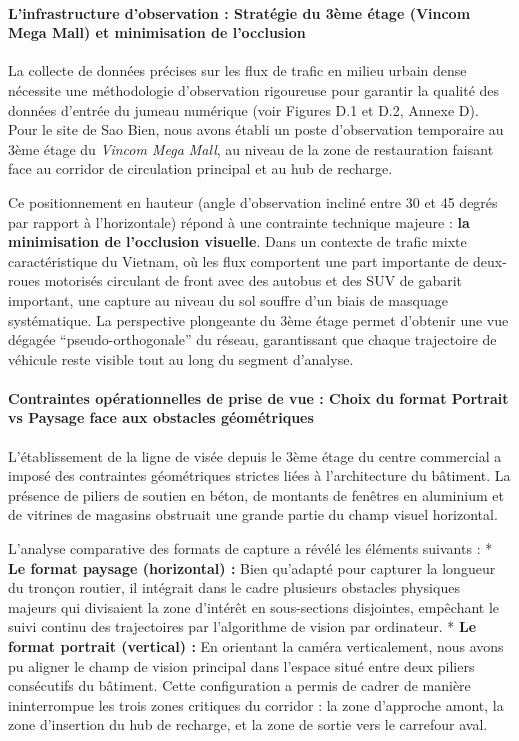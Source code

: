 \documentclass[10pt, a4paper]{article}
\begin{document}
\paragraph{L'infrastructure d'observation : Stratégie du 3ème étage
(Vincom Mega Mall) et minimisation de
l'occlusion}\label{linfrastructure-dobservation-stratuxe9gie-du-3uxe8me-uxe9tage-vincom-mega-mall-et-minimisation-de-locclusion}

La collecte de données précises sur les flux de trafic en milieu urbain
dense nécessite une méthodologie d'observation rigoureuse pour garantir
la qualité des données d'entrée du jumeau numérique (voir Figures D.1 et
D.2, Annexe D). Pour le site de Sao Bien, nous avons établi un poste
d'observation temporaire au 3ème étage du \emph{Vincom Mega Mall}, au
niveau de la zone de restauration faisant face au corridor de
circulation principal et au hub de recharge.

Ce positionnement en hauteur (angle d'observation incliné entre 30 et 45
degrés par rapport à l'horizontale) répond à une contrainte technique
majeure : \textbf{la minimisation de l'occlusion visuelle}. Dans un
contexte de trafic mixte caractéristique du Vietnam, où les flux
comportent une part importante de deux-roues motorisés circulant de
front avec des autobus et des SUV de gabarit important, une capture au
niveau du sol souffre d'un biais de masquage systématique. La
perspective plongeante du 3ème étage permet d'obtenir une vue dégagée
``pseudo-orthogonale'' du réseau, garantissant que chaque trajectoire de
véhicule reste visible tout au long du segment d'analyse.

\paragraph{Contraintes opérationnelles de prise de vue : Choix du format
Portrait vs Paysage face aux obstacles
géométriques}\label{contraintes-opuxe9rationnelles-de-prise-de-vue-choix-du-format-portrait-vs-paysage-face-aux-obstacles-guxe9omuxe9triques}

L'établissement de la ligne de visée depuis le 3ème étage du centre
commercial a imposé des contraintes géométriques strictes liées à
l'architecture du bâtiment. La présence de piliers de soutien en béton,
de montants de fenêtres en aluminium et de vitrines de magasins
obstruait une grande partie du champ visuel horizontal.

L'analyse comparative des formats de capture a révélé les éléments
suivants : * \textbf{Le format paysage (horizontal) :} Bien qu'adapté
pour capturer la longueur du tronçon routier, il intégrait dans le cadre
plusieurs obstacles physiques majeurs qui divisaient la zone d'intérêt
en sous-sections disjointes, empêchant le suivi continu des trajectoires
par l'algorithme de vision par ordinateur. * \textbf{Le format portrait
(vertical) :} En orientant la caméra verticalement, nous avons pu
aligner le champ de vision principal dans l'espace situé entre deux
piliers consécutifs du bâtiment. Cette configuration a permis de cadrer
de manière ininterrompue les trois zones critiques du corridor : la zone
d'approche amont, la zone d'insertion du hub de recharge, et la zone de
sortie vers le carrefour aval.
\end{document}
